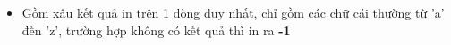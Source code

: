 \begin{itemize}
	\item     Gồm xâu kết quả in trên 1 dòng duy nhất, chỉ gồm các chữ cái thường từ 'a' đến 'z', trường hợp không có kết quả thì in ra    \textbf{     -1    }
\end{itemize}